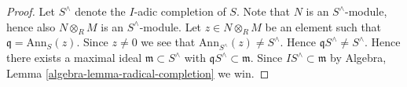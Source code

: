\documentclass[10pt,a4paper]{amsart}
\theoremstyle{plain}
\theoremstyle{definition}
\theoremstyle{remark}
\numberwithin{equation}{subsection}
\begin{document}
\begin{proof}
Let $S^\wedge$ denote the $I$-adic completion of $S$.
Note that $N$ is an $S^\wedge$-module, hence also
$N \otimes_R M$ is an $S^\wedge$-module.
Let $z \in N \otimes_R M$ be an element such that
$\mathfrak q = \text{Ann}_S(z)$. Since $z \not = 0$ we see
that $\text{Ann}_{S^\wedge}(z) \not = S^\wedge$. Hence
$\mathfrak q S^\wedge \not = S^\wedge$. Hence there exists a
maximal ideal $\mathfrak m \subset S^\wedge$ with
$\mathfrak q S^\wedge \subset \mathfrak m$. Since
$IS^\wedge \subset \mathfrak m$ by
Algebra, Lemma \ref{algebra-lemma-radical-completion}
we win.
\end{proof}
\end{document}
